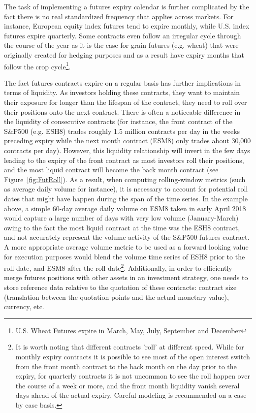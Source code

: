 \begin{itemize}
The task of implementing a futures expiry calendar is further complicated by the fact there is no real standardized frequency that applies across markets. For instance, European equity index futures tend to expire monthly, while U.S. index futures expire quarterly. Some contracts even follow an irregular cycle through the course of the year as it is the case for grain futures (e.g. wheat) that were originally created for hedging purposes and as a result have expiry months that follow the crop cycle\footnote{U.S. Wheat Futures expire in March, May, July, September and December}.


The fact futures contracts expire on a regular basis has further implications in terms of liquidity. As investors holding these contracts, they want to maintain their exposure for longer than the lifespan of the contract, they need to roll over their positions onto the next contract. There is often a noticeable difference in the liquidity of consecutive contracts (for instance, the front contract of the S\&P500 (e.g. ESH8) trades roughly 1.5 million contracts per day in the weeks preceding expiry while the next month contract (ESM8) only trades about 30,000 contracts per day). However, this liquidity relationship will invert in the few days leading to the expiry of the front contract as most investors roll their positions, and the most liquid contract will become the back month contract (see Figure~\ref{fig:FutRoll}). As a result, when computing rolling-window metrics (such as average daily volume for instance), it is necessary to account for potential roll dates that might have happen during the span of the time series. In the example above, a simple 60-day average daily volume on ESM8 taken in early April 2018 would capture a large number of days with very low volume (January-March) owing to the fact the most liquid contract at the time was the ESH8 contract, and not accurately represent the volume activity of the S\&P500 futures contract. A more appropriate average volume metric to be used as a forward looking value for execution purposes would blend the volume time series of ESH8 prior to the roll date, and ESM8 after the roll date\footnote{It is worth noting that different contracts 'roll' at different speed. While for monthly expiry contracts it is possible to see most of the open interest switch from the front month contract to the back month on the day prior to the expiry, for quarterly contracts it is not uncommon to see the roll happen over the course of a week or more, and the front month liquidity vanish several days ahead of the actual expiry. Careful modeling is recommended on a case by case basis.}. Additionally, in order to efficiently merge futures positions with other assets in an investment strategy, one needs to store reference data relative to the quotation of these contracts: contract size (translation between the quotation points and the actual monetary value), currency, etc. 


\end{itemize}
